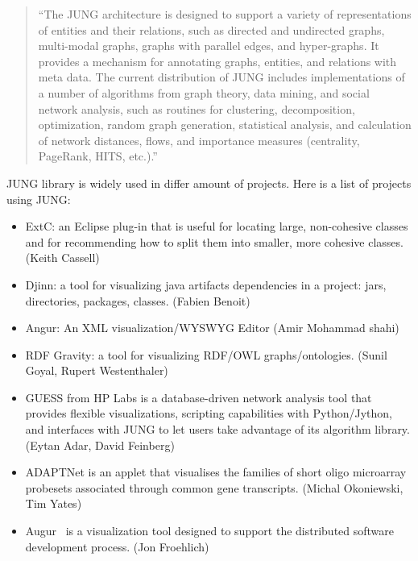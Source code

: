 \begin{enumerate}
\begin{quotation}
``The JUNG architecture is designed to support a variety of representations of entities and their relations,
such as directed and undirected graphs, multi-modal graphs, graphs with parallel edges, and hyper-graphs.
It provides a mechanism for annotating graphs, entities, and relations with meta data.
The current distribution of JUNG includes implementations of a number of algorithms from graph theory,
data mining, and social network analysis, such as routines for clustering, decomposition, optimization,
random graph generation, statistical analysis, and calculation of network distances, flows,
and importance measures (centrality, PageRank, HITS, etc.).''~\cite{JUNG_OVERVIEW}
\end{quotation}

JUNG library is widely used in differ amount of projects. Here is a list of projects using JUNG:

\begin{itemize}

\item ExtC: an Eclipse plug-in that is useful for locating large, non-cohesive classes and for recommending how to split them into smaller, more cohesive classes. (Keith Cassell)~\cite{EXTC}

\item Djinn: a tool for visualizing java artifacts dependencies in a project: jars, directories, packages, classes. (Fabien Benoit)~\cite{DJINN}

\item Angur: An XML visualization/WYSWYG Editor (Amir Mohammad shahi)~\cite{ANGUR}

\item RDF Gravity: a tool for visualizing RDF/OWL graphs/ontologies. (Sunil Goyal, Rupert Westenthaler)~\cite{RDF_GRAVITY}

\item GUESS from HP Labs is a database-driven network analysis tool that provides flexible visualizations, scripting capabilities with Python/Jython, and interfaces with JUNG to let users take advantage of its algorithm library. (Eytan Adar, David Feinberg)~\cite{GUESS}

\item ADAPTNet is an applet that visualises the families of short oligo microarray probesets associated through common gene transcripts. (Michal Okoniewski, Tim Yates)~\cite{ADAPTNET}

\item Augur~\cite{AUGUR} is a visualization tool designed to support the distributed software development process. (Jon Froehlich)~\cite{AUGUR_2}


\end{itemize}
\end{enumerate}

